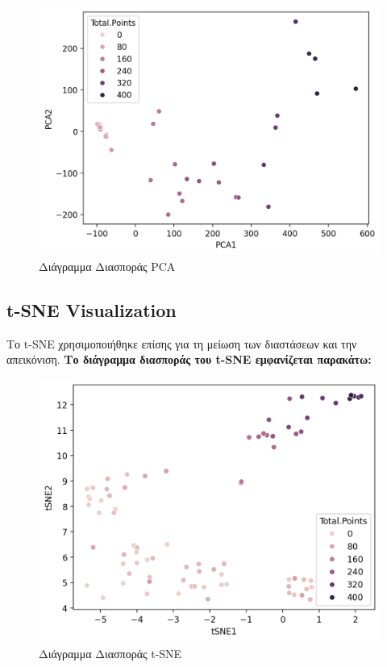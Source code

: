 \documentclass{article}
\begin{document}
\begin{figure}[h]
    \centering
    \includegraphics[width=\textwidth]{pca_plot.png} 
    \caption{Διάγραμμα Διασποράς PCA}
    \label{fig:pca}
\end{figure}

\subsection{t-SNE Visualization}
Το t-SNE χρησιμοποιήθηκε επίσης για τη μείωση των διαστάσεων και την απεικόνιση. \textbf{Το διάγραμμα διασποράς του t-SNE εμφανίζεται παρακάτω:}

\begin{figure}[h]
    \centering
    \includegraphics[width=\textwidth]{tsne_plot.png}
    \caption{Διάγραμμα Διασποράς t-SNE}
    \label{fig:tsne}
\end{figure}
\end{document}
